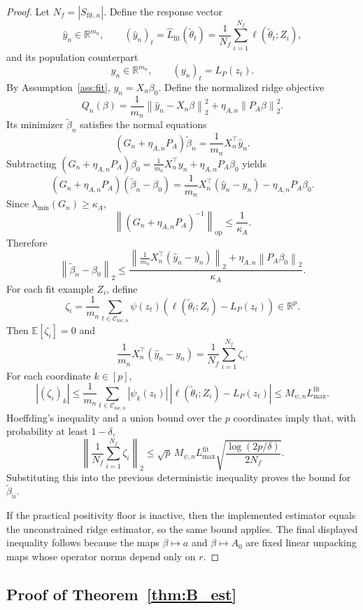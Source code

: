 \documentclass{article}
\newcommand{\RR}{\mathbb{R}}
\newcommand{\EE}{\mathbb{E}}
\newcommand{\cC}{\mathcal{C}}
\newcommand{\loss}{\ell}
\newcommand{\norm}[1]{\left\lVert #1 \right\rVert}
\newcommand{\abs}[1]{\left\lvert #1 \right\rvert}
\newcommand{\paren}[1]{\left( #1 \right)}
\begin{document}
\begin{proof}
Let \(N_f=\abs{S_{\mathrm{fit},n}}\). Define the response vector
\[
\hat y_n \in \RR^{m_n},
\qquad
(\hat y_n)_t = \widehat L_{\mathrm{fit}}(\tilde\theta_t)
=
\frac{1}{N_f}\sum_{i=1}^{N_f} \loss(\tilde\theta_t;Z_i),
\]
and its population counterpart
\[
y_n \in \RR^{m_n},
\qquad
(y_n)_t = L_P(z_t).
\]
By Assumption~\ref{ass:fit}, \(y_n = X_n\beta_0\). Define the normalized ridge objective
\[
Q_n(\beta)
=
\frac{1}{m_n}\norm{\hat y_n - X_n\beta}_2^2 + \eta_{A,n}\norm{P_A\beta}_2^2.
\]
Its minimizer \(\tilde\beta_n\) satisfies the normal equations
\[
(G_n+\eta_{A,n}P_A)\tilde\beta_n = \frac{1}{m_n}X_n^\top \hat y_n.
\]
Subtracting \((G_n+\eta_{A,n}P_A)\beta_0 = \frac{1}{m_n}X_n^\top y_n + \eta_{A,n}P_A\beta_0\) yields
\[
(G_n+\eta_{A,n}P_A)(\tilde\beta_n-\beta_0)
=
\frac{1}{m_n}X_n^\top(\hat y_n-y_n) - \eta_{A,n}P_A\beta_0.
\]
Since \(\lambda_{\min}(G_n)\ge \kappa_A\),
\[
\norm{(G_n+\eta_{A,n}P_A)^{-1}}_{\mathrm{op}}
\le
\frac{1}{\kappa_A}.
\]
Therefore
\[
\norm{\tilde\beta_n-\beta_0}_2
\le
\frac{
\norm{\frac{1}{m_n}X_n^\top(\hat y_n-y_n)}_2 + \eta_{A,n}\norm{P_A\beta_0}_2
}{\kappa_A}.
\]
For each fit example \(Z_i\), define
\[
\zeta_i
=
\frac{1}{m_n}\sum_{t\in\cC_{\mathrm{loc},n}}
\psi(z_t)\paren{\loss(\tilde\theta_t;Z_i)-L_P(z_t)}
\in \RR^p.
\]
Then \(\EE[\zeta_i]=0\) and
\[
\frac{1}{m_n}X_n^\top(\hat y_n-y_n)
=
\frac{1}{N_f}\sum_{i=1}^{N_f}\zeta_i.
\]
For each coordinate \(k\in[p]\),
\[
\abs{(\zeta_i)_k}
\le
\frac{1}{m_n}\sum_{t\in\cC_{\mathrm{loc},n}}
\abs{\psi_k(z_t)}\,\abs{\loss(\tilde\theta_t;Z_i)-L_P(z_t)}
\le
M_{\psi,n}L_{\max}^{\mathrm{fit}}.
\]
Hoeffding's inequality and a union bound over the \(p\) coordinates imply that, with probability at least \(1-\delta\),
\[
\norm{\frac{1}{N_f}\sum_{i=1}^{N_f}\zeta_i}_2
\le
\sqrt{p}\,M_{\psi,n}L_{\max}^{\mathrm{fit}}
\sqrt{\frac{\log(2p/\delta)}{2N_f}}.
\]
Substituting this into the previous deterministic inequality proves the bound for \(\tilde\beta_n\).

If the practical positivity floor is inactive, then the implemented estimator equals the unconstrained ridge estimator, so the same bound applies. The final displayed inequality follows because the maps \(\beta\mapsto a\) and \(\beta\mapsto A_0\) are fixed linear unpacking maps whose operator norms depend only on \(r\).
\end{proof}

\subsection{Proof of Theorem~\ref{thm:B_est}}
\end{document}
